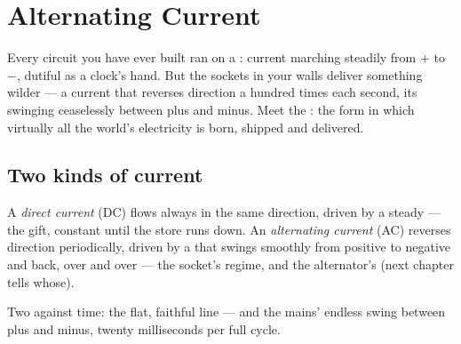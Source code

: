 \chapter{Alternating Current}\label{ch:g9:alternating-current}

Every circuit you have ever built ran on a : current
marching steadily from $+$ to $-$, dutiful as a clock's hand.
But the sockets in your walls deliver something wilder --- a
current that reverses direction a hundred times each second,
its  swinging ceaselessly between plus and minus. Meet
the : the form in which virtually all the
world's electricity is born, shipped and delivered.

\section{Two kinds of current}

\begin{definition}\label{def:g9:alternating-current:dcac}
A \emph{direct current} (DC) flows
always in the same direction, driven by a steady  ---
the  gift, constant until the store runs down. An
\emph{alternating current} (AC)
reverses direction periodically, driven by a  that
swings smoothly from positive to negative and back, over and
over --- the socket's regime, and the alternator's (next
chapter tells whose).
\end{definition}

\begin{omfigure}

{\small Two  against time: the  flat,
faithful line --- and the mains' endless swing between plus
and minus, twenty milliseconds per full cycle.}
\end{omfigure}

